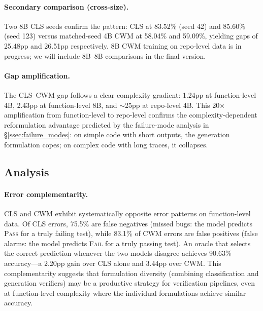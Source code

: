 \paragraph{Secondary comparison (cross-size).}
Two 8B CLS seeds confirm the pattern: CLS at 83.52\% (seed 42) and 85.60\% (seed 123) versus matched-seed 4B CWM at 58.04\% and 59.09\%, yielding gaps of 25.48pp and 26.51pp respectively.
8B CWM training on repo-level data is in progress; we will include 8B--8B comparisons in the final version.

\paragraph{Gap amplification.}
The CLS--CWM gap follows a clear complexity gradient: 1.24pp at function-level 4B, 2.43pp at function-level 8B, and $\sim$25pp at repo-level 4B.
This 20$\times$ amplification from function-level to repo-level confirms the complexity-dependent reformulation advantage predicted by the failure-mode analysis in \S\ref{ssec:failure_modes}: on simple code with short outputs, the generation formulation copes; on complex code with long traces, it collapses.


\subsection{Analysis}
\label{ssec:analysis}


\paragraph{Error complementarity.}
CLS and CWM exhibit systematically opposite error patterns on function-level data.
Of CLS errors, 75.5\% are false negatives (missed bugs: the model predicts \textsc{Pass} for a truly failing test), while 83.1\% of CWM errors are false positives (false alarms: the model predicts \textsc{Fail} for a truly passing test).
An oracle that selects the correct prediction whenever the two models disagree achieves 90.63\% accuracy---a 2.20pp gain over CLS alone and 3.44pp over CWM.
This complementarity suggests that formulation diversity (combining classification and generation verifiers) may be a productive strategy for verification pipelines, even at function-level complexity where the individual formulations achieve similar accuracy.


